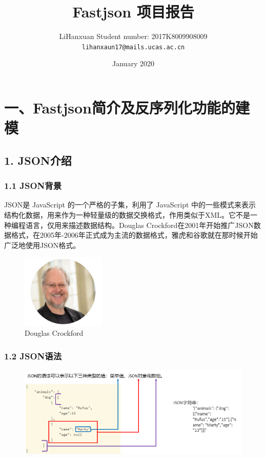 \documentclass{article}
\title{\vspace{-1\baselineskip}
\huge{\textbf{Fastjson 项目报告}}
}
\author{LiHanxuan \qquad Student number: 2017K8009908009 \\{\tt lihanxaun17@mails.ucas.ac.cn}}
\date{January 2020}
\begin{document}
\maketitle


\section*{\Large 一、Fastjson简介及反序列化功能的建模}
\subsection*{1. JSON介绍}
\subsubsection*{1.1 JSON背景}
JSON是 JavaScript 的一个严格的子集，利用了 JavaScript 中的一些模式来表示结构化数据，用来作为一种轻量级的数据交换格式，作用类似于XML。它不是一种编程语言，仅用来描述数据结构。Douglas Crockford在2001年开始推广JSON数据格式，在2005年-2006年正式成为主流的数据格式，雅虎和谷歌就在那时候开始广泛地使用JSON格式。

\begin{figure}[htp]
\centering %
\includegraphics[width = 4cm]{pic1.png}
\caption{Douglas Crockford}
\end{figure}

\subsubsection*{1.2 JSON语法}
\begin{figure}[H]
\centering %
\includegraphics[width = 15cm]{pic2.png}
\end{figure}
\end{document}
